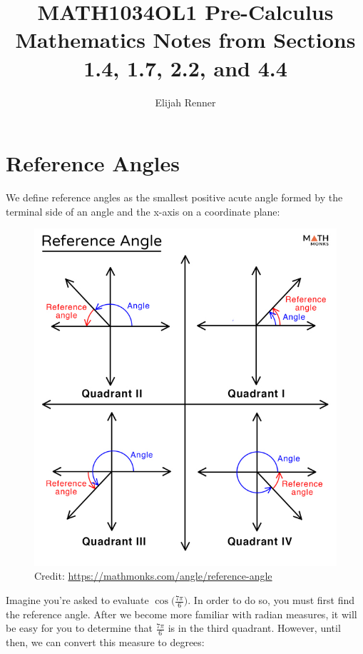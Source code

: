\documentclass[12pt]{article}
\title{MATH1034OL1 Pre-Calculus Mathematics Notes from Sections 1.4, 1.7, 2.2, and 4.4}
\author{Elijah Renner}
\begin{document}
\maketitle

\vspace{0.5in}

\tableofcontents





\section{Reference Angles}
We define reference angles as the smallest positive acute angle formed by the terminal side of an angle and the x-axis on a coordinate plane:\\

\begin{figure}[ht]
	\centering
	\includegraphics[scale=0.25]{Reference-Angle}
	\caption{Credit: \url{https://mathmonks.com/angle/reference-angle}}
\end{figure}

Imagine you're asked to evaluate \(\cos({\frac{7\pi}{6})}\). In order to do so, you must first find the reference angle. After we become more familiar with radian measures, it will be easy for you to determine that \(\frac{7\pi}{6}\) is in the third quadrant. However, until then, we can convert this measure to degrees: \\
\end{document}
